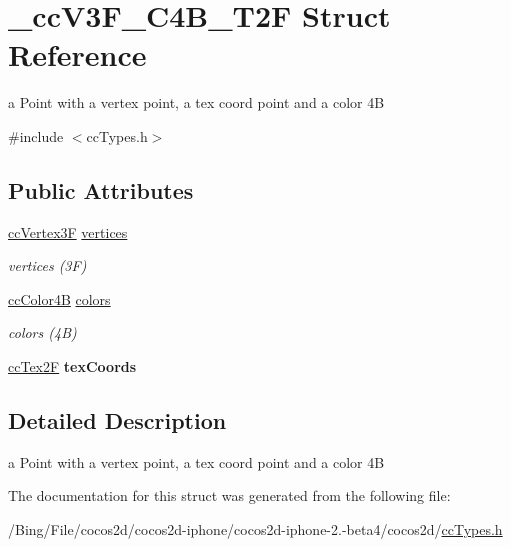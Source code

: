 \hypertarget{struct__cc_v3_f___c4_b___t2_f}{\section{\-\_\-cc\-V3\-F\-\_\-\-C4\-B\-\_\-\-T2\-F Struct Reference}
\label{struct__cc_v3_f___c4_b___t2_f}
}


a Point with a vertex point, a tex coord point and a color 4\-B  




{\ttfamily \#include $<$cc\-Types.\-h$>$}

\subsection*{Public Attributes}
\begin{DoxyCompactItemize}
\item 
\hypertarget{struct__cc_v3_f___c4_b___t2_f_a638506dcd0346e63dd1c0ad4765ac8bc}{\hyperlink{cc_types_8h_a351ac51e9885af9a15676faf8cb49f8a}{cc\-Vertex3\-F} \hyperlink{struct__cc_v3_f___c4_b___t2_f_a638506dcd0346e63dd1c0ad4765ac8bc}{vertices}}\label{struct__cc_v3_f___c4_b___t2_f_a638506dcd0346e63dd1c0ad4765ac8bc}

\begin{DoxyCompactList}\small\item\em vertices (3\-F) \end{DoxyCompactList}\item 
\hypertarget{struct__cc_v3_f___c4_b___t2_f_a8a1d6c1385721a1f3e633f339ec9fdce}{\hyperlink{cc_types_8h_a2f83e39e0378b79d089014c140169793}{cc\-Color4\-B} \hyperlink{struct__cc_v3_f___c4_b___t2_f_a8a1d6c1385721a1f3e633f339ec9fdce}{colors}}\label{struct__cc_v3_f___c4_b___t2_f_a8a1d6c1385721a1f3e633f339ec9fdce}

\begin{DoxyCompactList}\small\item\em colors (4\-B) \end{DoxyCompactList}\item 
\hypertarget{struct__cc_v3_f___c4_b___t2_f_a393c7dfa5f174113895eb7c7323d834f}{\hyperlink{cc_types_8h_a95226f1345c203215cc1f419aafe47c5}{cc\-Tex2\-F} {\bfseries tex\-Coords}}\label{struct__cc_v3_f___c4_b___t2_f_a393c7dfa5f174113895eb7c7323d834f}

\end{DoxyCompactItemize}


\subsection{Detailed Description}
a Point with a vertex point, a tex coord point and a color 4\-B 

The documentation for this struct was generated from the following file\-:\begin{DoxyCompactItemize}
\item 
/\-Bing/\-File/cocos2d/cocos2d-\/iphone/cocos2d-\/iphone-\/2.-\/beta4/cocos2d/\hyperlink{cc_types_8h}{cc\-Types.\-h}\end{DoxyCompactItemize}
